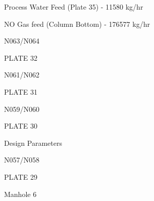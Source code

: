 \documentclass[a4paper,portrait,12pt]{article}
\begin{document}
\begin{flushleft}
Process Water Feed (Plate 35) - 11580 kg/hr
\end{flushleft}


\begin{flushleft}
NO Gas feed (Column Bottom) - 176577 kg/hr
\end{flushleft}





\begin{flushleft}
N063/N064
\end{flushleft}





\begin{flushleft}
PLATE 32
\end{flushleft}


\begin{flushleft}
N061/N062
\end{flushleft}





\begin{flushleft}
PLATE 31
\end{flushleft}





\begin{flushleft}
N059/N060
\end{flushleft}





\begin{flushleft}
PLATE 30
\end{flushleft}





\begin{flushleft}
Design Parameters
\end{flushleft}





\begin{flushleft}
N057/N058
\end{flushleft}





\begin{flushleft}
PLATE 29
\end{flushleft}


\begin{flushleft}
Manhole 6
\end{flushleft}
\end{document}
